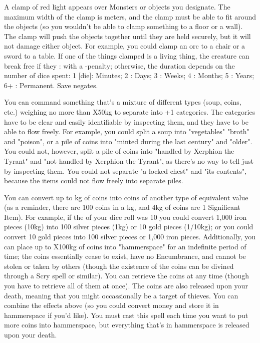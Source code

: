 {\MYSTERY [
  Name = Clamp,
  Link = arcana-mystery-clamp,
  Paradigm = Force,
  Save = Y (neg.),
  Duration = varies,
  Target = Nearby Target(s)
]

A clamp of red light appears over \DICE Monsters or objects you designate. The maximum width of the clamp is \DICE meters, and the clamp must be able to fit around the objects (so you wouldn't be able to clamp something to a floor or a wall).  The clamp will push the objects together until they are held securely, but it will not damage either object.  For example, you could clamp an orc to a chair or a sword to a table.  If one of the things clamped is a living thing, the creature can break free if they \RB : \VIG with a -\DICE penalty; otherwise, the duration depends on the number of dice spent:  1 [die]: Minutes; 2 \DICE: Days; 3 \DICE: Weeks; 4 \DICE: Months; 5 \DICE: Years; 6+ \DICE: Permanent.  Save negates.


\MYSTERY [
  Name = Divvy,
  Link = arcana-mystery-divvy,
  Paradigm = Entropy,
  Save = N,
  Duration = Permanent,
  Target = Close Target(s)
]

You can command something that's a mixture of different types (soup, coins, etc.) weighing no more than \DICE X50kg to separate into \DICE+1 categories.  The categories have to be clear and easily identifiable by inspecting them, and they have to be able to flow freely.  For example, you could split a soup into "vegetables" "broth" and "poison", or a pile of coins into "minted during the last century" and "older". You could not, however, split a pile of coins into "handled by Xerphion the Tyrant" and "not handled by Xerphion the Tyrant", as there's no way to tell just by inspecting them. You could not separate "a locked chest" and "its contents", because the items could not flow freely into separate piles.


\MYSTERY [
  Name = Exchequer,
  Link = arcana-mystery-exchequer,
  Paradigm = Entropy,
  Save = N,
  Duration = Instant,
  Target = Close Target(s)
]

You can convert up to \SUMDICE kg of coins into coins of another type of equivalent value (as a reminder, there are 100 coins in a kg, and 4kg of coins are 1 Significant Item). For example, if the \SUMDICE of your dice roll was 10 you could convert 1,000 iron pieces (10kg) into 100 silver pieces (1kg) or 10 gold pieces (1/10kg); or you could convert 10 gold pieces into 100 silver pieces or 1,000 iron pieces. Additionally, you can place up to \DICE X100kg of coins into "hammerspace" for an indefinite period of time; the coins essentially cease to exist, have no Encumbrance, and cannot be stolen or taken by others (though the existence of the coins can be divined through a Scry spell or similar).  You can retrieve the coins at any time (though you have to retrieve all of them at once).  The coins are also released upon your death, meaning that you might occassionally be a target of thieves.
You can combine the effects above (so you could convert money and store it in hammerspace if you'd like).  You must cast this spell each time you want to put more coins into hammerspace, but everything that's in hammerspace is released upon your death.


}
